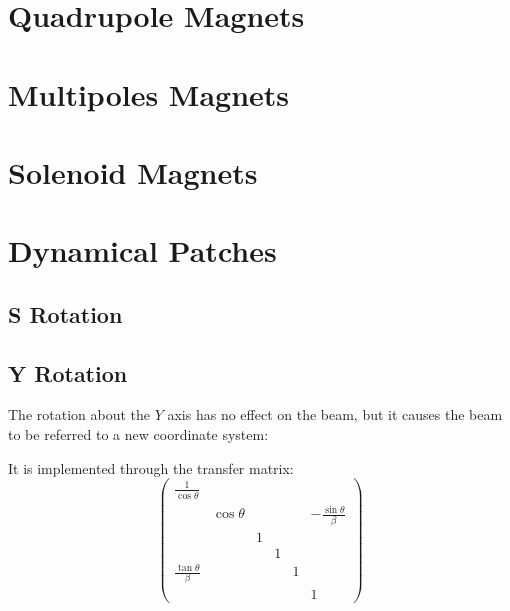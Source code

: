 \documentclass{cern-art} %
\begin{document}
\section{Quadrupole Magnets}

\section{Multipoles Magnets}

\section{Solenoid Magnets}

\section{Dynamical Patches}

\subsection{S Rotation}

\subsection{Y Rotation}
The rotation about the $Y$ axis has no effect on the beam, but it causes the beam to be referred to a new coordinate system:


It is implemented through the transfer matrix:
$$\left(\begin{array}{cccccc}
\frac{1}{\cos\theta}\\
 & \cos\theta &  &  &  & -\frac{\sin\theta}{\beta}\\
 &  & 1\\
 &  &  & 1\\
\frac{\tan\theta}{\beta} &  &  &  & 1\\
 &  &  &  &  & 1
\end{array}\right)$$


\appendix
\end{document}
